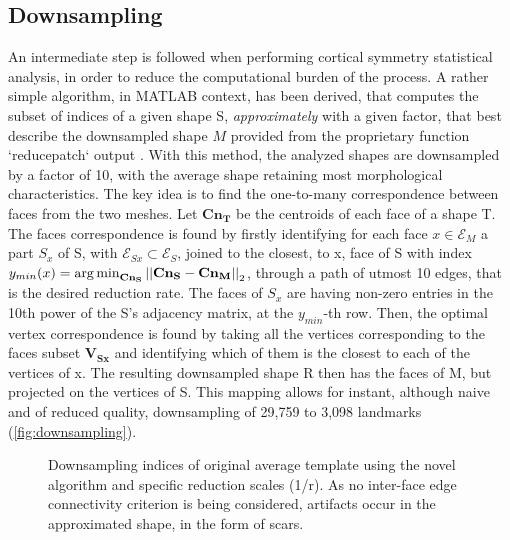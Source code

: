 \subsection{Downsampling}
\label{subsec:downsampling}
An intermediate step is followed when performing cortical symmetry statistical analysis, in order to reduce the computational burden of the process. A rather simple algorithm, in MATLAB context, has been derived, that computes the subset of indices of a given shape S, \textit{approximately} with a given factor, that best describe the downsampled shape $M$ provided from the  proprietary function `reducepatch` output \cite{Lopez2014}. With this method, the analyzed shapes are downsampled by a factor of 10, with the average shape retaining most morphological characteristics. The key idea is to find the one-to-many correspondence between faces from the two meshes. Let $\mathbf{{Cn}_T}$ be the centroids of each face of a shape T. The faces correspondence is found by firstly identifying for each face $x\in \mathcal{E}_M$ a part $S_x$ of S, with $\mathcal{E}_{Sx}\subset \mathcal{E}_S$, joined to the closest, to x, face of S with index $y_{min}(x)=\operatorname*{arg\,min}_{\mathbf{{Cn}_{S}}}\left|\left|\mathbf{{Cn}_{S}}-\mathbf{{Cn}_M}\right|\right|_2$, through a path of utmost 10 edges, that is the desired reduction rate. The faces of $S_x$ are having non-zero entries in the 10th power of the S's adjacency matrix, at the $y_{min}$-th row. Then, the optimal vertex correspondence is found by taking all the vertices corresponding to the faces subset $\mathbf{{V}_{Sx}}$ and identifying which of them is the closest to each of the vertices of x. The resulting downsampled shape R then has the faces of M, but projected on the vertices of S. This mapping allows for instant, although naive and of reduced quality, downsampling of 29,759 to 3,098 landmarks (\autoref{fig:downsampling}).
\begin{figure}[H]
	\centering
	
	\caption[Cortical surface downsampling]{Downsampling indices of original average template using the novel algorithm and specific reduction scales (1/r). As no inter-face edge connectivity criterion is being considered, artifacts occur in the approximated shape, in the form of scars.}
	\label{fig:downsampling}
\end{figure}

